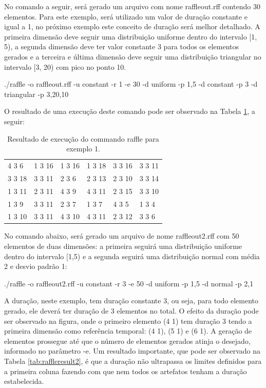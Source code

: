 No comando a seguir, será gerado um arquivo com nome raffleout.rff contendo 30 elementos. Para este exemplo, será utilizado um valor de duração constante e igual a 1, no próximo exemplo este conceito de duração será melhor detalhado. A primeira dimensão deve seguir uma distribuição uniforme dentro do intervalo [1, 5), a segunda dimensão deve ter valor constante 3 para todos os elementos gerados e a terceira e última dimensão deve seguir uma distribuição triangular no intervalo [3, 20) com pico no ponto 10.

./raffle -o raffleout.rff -u constant -r 1 -e 30 -d uniform -p 1,5 -d constant -p 3 -d triangular -p 3,20,10

O resultado de uma execução deste comando pode ser observado na Tabela \ref{tab:raffleresult1}, a seguir:

\begin{table}[!h]
	\centering
	\caption{Resultado de execução do commando raffle para exemplo 1.}
	\label{tab:raffleresult1}
	\begin{tabular}{|l|l|l|l|l|l|}
		\hline
		4 3 6 & 1 3 16 & 1 3 16 & 1 3 18 & 3 3 16 & 3 3 11 \\
		3 3 18 & 3 3 11 & 2 3 6 & 2 3 13 & 2 3 10 & 3 3 14 \\
		1 3 11 & 2 3 11 & 4 3 9 & 4 3 11 & 2 3 15 & 3 3 10 \\
		1 3 9 & 3 3 11 & 2 3 7 & 1 3 7 & 4 3 5 & 1 3 4 \\
		1 3 10 & 3 3 11 & 4 3 10 & 4 3 11 & 2 3 12 & 3 3 6 \\
		\hline
	\end{tabular}
\end{table}

No comando abaixo, será gerado um arquivo de nome raffleout2.rff com 50 elementos de duas dimensões: a primeira seguirá uma distribuição uniforme dentro do intervalo [1,5) e a segunda seguirá uma distribuição normal com média 2 e desvio padrão 1:

./raffle -o raffleout2.rff -u constant -r 3 -e 50 -d uniform -p 1,5 -d normal -p 2,1

A duração, neste exemplo, tem duração constante 3, ou seja, para todo elemento gerado, ele deverá ter duração de 3 elementos no total. O efeito da duração pode ser observado na figura, onde o primeiro elemento (4 1) tem duração 3 tendo a primeira dimensão como referência temporal: (4 1), (5 1) e (6 1). A geração de elementos prossegue até que o número de elementos gerados atinja o desejado, informado no parâmetro -e. Um resultado importante, que pode ser observado na Tabela \ref{tab:raffleresult2}, é que a duração não ultrapassa os limites definidos para a primeira coluna fazendo com que nem todos os artefatos tenham a duração estabelecida.

